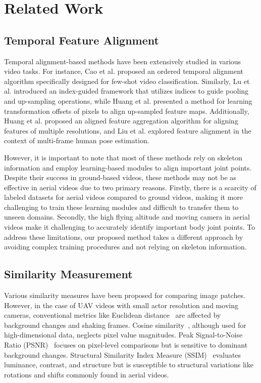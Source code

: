 \documentclass[10pt,twocolumn,letterpaper]{article}
\begin{document}
 \section{Related Work}
\label{sec:related}
\subsection{Temporal Feature Alignment}
Temporal alignment-based methods have been extensively studied in various video tasks. For instance, Cao et al. \cite{cao2020few} proposed an ordered temporal alignment algorithm specifically designed for few-shot video classification. Similarly, Lu et al. \cite{lu2019indices} introduced an index-guided framework that utilizes indices to guide pooling and up-sampling operations, while Huang et al. \cite{huang2021fapn} presented a method for learning transformation offsets of pixels to align up-sampled feature maps. Additionally, Huang et al. \cite{huang2021alignseg} proposed an aligned feature aggregation algorithm for aligning features of multiple resolutions, and Liu et al. \cite{liu2022temporal} explored feature alignment in the context of multi-frame human pose estimation.

However, it is important to note that most of these methods rely on skeleton information and employ learning-based modules to align important joint points. Despite their success in ground-based videos, these methods may not be as effective in aerial videos due to two primary reasons. Firstly, there is a scarcity of labeled datasets for aerial videos compared to ground videos, making it more challenging to train these learning modules and difficult to transfer them to unseen domains. Secondly, the high flying altitude and moving camera in aerial videos make it challenging to accurately identify important body joint points. To address these limitations, our proposed method takes a different approach by avoiding complex training procedures and not relying on skeleton information. 







\subsection{Similarity Measurement}


Various similarity measures have been proposed for comparing image patches. However, in the case of UAV videos with small actor resolution and moving cameras, conventional metrics like Euclidean distance~\cite{zhi2021mgsampler} are affected by background changes and shaking frames. Cosine similarity~\cite{hoe2021one}, although used for high-dimensional data, neglects pixel value magnitudes. Peak Signal-to-Noise Ratio (PSNR)~\cite{hore2010image} focuses on pixel-level comparisons but is sensitive to dominant background changes. Structural Similarity Index Measure (SSIM)~\cite{setiadi2021psnr} evaluates luminance, contrast, and structure but is susceptible to structural variations like rotations and shifts commonly found in aerial videos.
\end{document}
